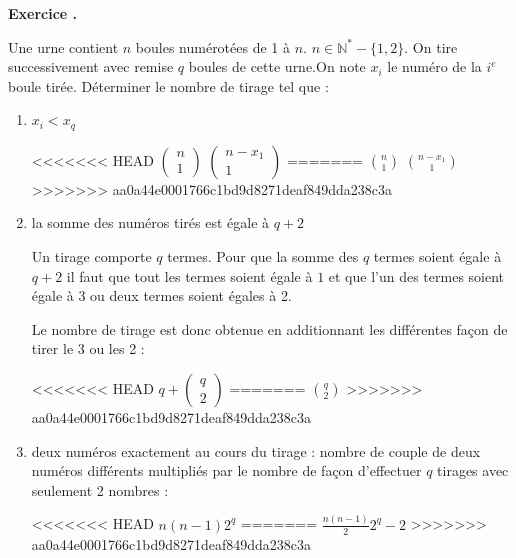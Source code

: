 \documentclass[a4paper,10pt]{article}
\newcounter{exercice}
\newcommand{\exercice}{%
		\refstepcounter{exercice}%
		\bigskip
		\bigskip
		\noindent\textbf{Exercice \theexercice.}~%
	}
\newcommand{\N}{\mathbb{N}}
\begin{document}
	\exercice
	Une urne contient $n$ boules numérotées de 1 à $n$. $n \in \N^*-\{1,2\}$. On tire successivement avec remise $q$ boules de cette urne.On note $x_i$ le numéro de la $i^e$ boule tirée. Déterminer le nombre de tirage tel que :
		\begin{enumerate}
		\item $x_i<x_q$ 
		\begin{center}
<<<<<<< HEAD
		$\left(\begin{array}{c} n \\ 1 \end{array} \right)$
		$\left(\begin{array}{c} n-x_1 \\ 1 \end{array} \right)$
=======
		$\binom{n}{1}$
		$\binom{n-x_1}{ 1}$
>>>>>>> aa0a44e0001766c1bd9d8271deaf849dda238c3a
		 \end{center}
		\item la somme des numéros tirés est égale à $q+2$
		
		Un tirage comporte $q$ termes. Pour que la somme des $q$ termes soient égale à $q+2$ il faut que tout les termes soient égale à $1$ et que l'un des termes soient égale à 3 ou deux termes soient égales à 2.
		
		Le nombre de tirage est donc obtenue en additionnant les différentes façon de tirer le 3 ou les 2 :
		\begin{center}
<<<<<<< HEAD
			$q + \left(\begin{array}{c} q \\ 2 \end{array} \right)$
=======
			$\binom{q}{2}$
>>>>>>> aa0a44e0001766c1bd9d8271deaf849dda238c3a
		 \end{center}
		\item deux numéros exactement au cours du tirage :
		nombre de couple de deux numéros différents  multipliés par le nombre de façon d'effectuer $q$ tirages avec seulement 2 nombres :
		\begin{center}
<<<<<<< HEAD
			$n(n-1)2^q $
=======
			$\frac{n(n-1)}{2}2^q-2 $
>>>>>>> aa0a44e0001766c1bd9d8271deaf849dda238c3a
		 \end{center}
		
		\end{enumerate}
	 
\end{document}
